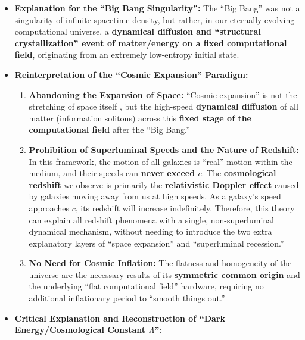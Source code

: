 \documentclass[11pt, a4paper]{article}
\begin{document}
\begin{itemize}
    \item \textbf{Explanation for the ``Big Bang Singularity'':}
    The ``Big Bang'' was not a singularity of infinite spacetime density, but rather, in our eternally evolving computational universe, a \textbf{dynamical diffusion and ``structural crystallization'' event of matter/energy on a fixed computational field}, originating from an extremely low-entropy initial state.

    \item \textbf{Reinterpretation of the ``Cosmic Expansion'' Paradigm:}
    \begin{enumerate}
        \item \textbf{Abandoning the Expansion of Space:} ``Cosmic expansion'' is not the stretching of space itself \cite{Guth1981}, but the high-speed \textbf{dynamical diffusion} of all matter (information solitons) across this \textbf{fixed stage of the computational field} after the ``Big Bang.''
        \item \textbf{Prohibition of Superluminal Speeds and the Nature of Redshift:} In this framework, the motion of all galaxies is ``real'' motion within the medium, and their speeds can \textbf{never exceed $c$}. The \textbf{cosmological redshift} we observe is primarily the \textbf{relativistic Doppler effect} caused by galaxies moving away from us at high speeds. As a galaxy's speed approaches $c$, its redshift will increase indefinitely. Therefore, this theory can explain all redshift phenomena with a single, non-superluminal dynamical mechanism, without needing to introduce the two extra explanatory layers of ``space expansion'' and ``superluminal recession.''
        \item \textbf{No Need for Cosmic Inflation:} The flatness and homogeneity of the universe are the necessary results of its \textbf{symmetric common origin} and the underlying ``flat computational field'' hardware, requiring no additional inflationary period to ``smooth things out.''
    \end{enumerate}

    \item \textbf{Critical Explanation and Reconstruction of ``Dark Energy/Cosmological Constant $\Lambda$''}:


\end{itemize}
\end{document}
